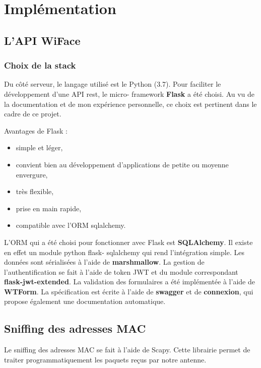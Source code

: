 \chapter{Implémentation}
\label{ch:implémentation}

\section{L'API WiFace}

\subsection{Choix de la stack}

Du côté serveur, le langage utilisé est le Python (3.7). Pour faciliter le développement d’une API rest, le micro-
framework \textbf{Flask} a été choisi. Au vu de la documentation et de mon expérience personnelle, ce choix est pertinent
dans le cadre de ce projet.

Avantages de Flask :
\begin{itemize}
\item simple et léger,
\item convient bien au développement d’applications de petite ou moyenne envergure,
\item très flexible,
\item prise en main rapide,
\item compatible avec l’ORM sqlalchemy.
\end{itemize}

L’ORM qui a été choisi pour fonctionner avec Flask est \textbf{SQLAlchemy}. Il existe en effet un module python flask-
sqlalchemy qui rend l’intégration simple.
Les données sont sérialisées à l’aide de \textbf{marshmallow}.
La gestion de l’authentification se fait à l’aide de token JWT et du module correspondant \textbf{flask-jwt-extended}.
La validation des formulaires a été implémentée à l'aide de \textbf{WTForm}.
La spécification est écrite à l’aide de \textbf{swagger} et de \textbf{connexion}, qui propose également une documentation automatique.

\section{Sniffing des adresses MAC}

Le sniffing des adresses MAC se fait à l'aide de Scapy.
Cette librairie permet de traiter programmatiquement les paquets
reçus par notre antenne. 

